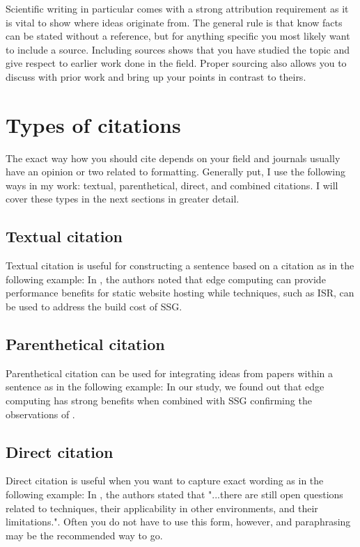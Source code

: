 Scientific writing in particular comes with a strong attribution requirement as it is vital to show where ideas originate from.
The general rule is that know facts can be stated without a reference, but for anything specific you most likely want to include a source.
Including sources shows that you have studied the topic and give respect to earlier work done in the field.
Proper sourcing also allows you to discuss with prior work and bring up your points in contrast to theirs.

\section{Types of citations}

The exact way how you should cite depends on your field and journals usually have an opinion or two related to formatting.
Generally put, I use the following ways in my work: textual, parenthetical, direct, and combined citations.
I will cover these types in the next sections in greater detail.

\subsection{Textual citation}

Textual citation is useful for constructing a sentence based on a citation as in the following example: In \citet{vepsalainen2023implications}, the authors noted that edge computing can provide performance benefits for static website hosting while techniques, such as ISR, can be used to address the build cost of SSG.

\subsection{Parenthetical citation}

Parenthetical citation can be used for integrating ideas from papers within a sentence as in the following example: In our study, we found out that edge computing has strong benefits when combined with SSG confirming the observations of \citep{vepsalainen2023implications}.

\subsection{Direct citation}

Direct citation is useful when you want to capture exact wording as in the following example: In \citet{vepsalainen2023implications}, the authors stated that "...there are still open questions related to techniques, their applicability in other environments, and their limitations.". Often you do not have to use this form, however, and paraphrasing may be the recommended way to go.

